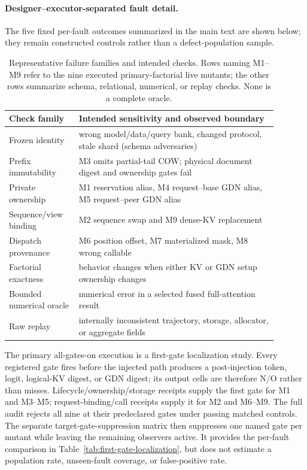 \documentclass{article}
\begin{document}


\paragraph{Designer--executor-separated fault detail.}
The five fixed per-fault outcomes summarized in the main text are shown below;
they remain constructed controls rather than a defect-population sample.


\begin{table}[H]
\caption{Representative failure families and intended checks.  Rows naming
M1--M9 refer to the nine executed primary-factorial live mutants; the other
rows summarize schema, relational, numerical, or replay checks.  None is a
complete oracle.}
\centering\small
\begin{tabular}{@{}p{0.23\linewidth}p{0.66\linewidth}@{}}
\toprule
Check family & Intended sensitivity and observed boundary \\
\midrule
Frozen identity & wrong model/data/query bank, changed protocol, stale shard (schema adversaries)\\
Prefix immutability & M3 omits partial-tail COW; physical document digest and ownership gates fail\\
Private ownership & M1 reservation alias, M4 request--base GDN alias, M5 request--peer GDN alias\\
Sequence/view binding & M2 sequence swap and M9 dense-KV replacement\\
Dispatch provenance & M6 position offset, M7 materialized mask, M8 wrong callable\\
Factorial exactness & behavior changes when either KV or GDN setup ownership changes\\
Bounded numerical oracle & numerical error in a selected fused full-attention result\\
Raw replay & internally inconsistent trajectory, storage, allocator, or aggregate fields\\
\bottomrule
\end{tabular}
\end{table}

The primary all-gates-on execution is a first-gate localization study.  Every registered gate
fires before the injected path produces a post-injection token, logit,
logical-KV digest, or GDN digest; its output cells are therefore N/O rather
than misses.
Lifecycle/ownership/storage receipts supply the first gate for M1 and M3--M5;
request-binding/call receipts supply it for M2 and M6--M9.  The full audit
rejects all nine at their predeclared gates under passing matched controls.
The separate target-gate-suppression matrix then suppresses one named gate per mutant while leaving
the remaining observers active.  It provides the per-fault comparison in
Table~\ref{tab:first-gate-localization}, but does not estimate a population
rate, unseen-fault coverage, or false-positive rate.
\end{document}
